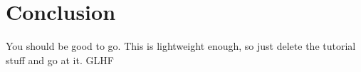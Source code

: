 \section{Conclusion}\label{conclusion}
You should be good to go. This is lightweight enough, so just delete the tutorial stuff and go at it. GLHF